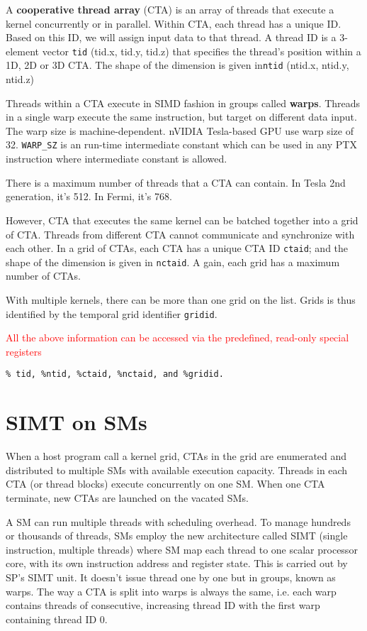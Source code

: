 A {\bf cooperative thread array} (CTA) is an array of threads that
execute a kernel concurrently or in parallel. Within CTA, each thread
has a unique ID. Based on this ID, we will assign input data to that
thread. A thread ID is a 3-element vector \verb!tid! (tid.x, tid.y,
tid.z) that specifies the thread's position within a 1D, 2D or 3D CTA.
The shape of the dimension is given in\verb!ntid! (ntid.x, ntid.y,
ntid.z)

Threads within a CTA execute in SIMD fashion in groups called
{\bf warps}. Threads in a single warp execute the same instruction,
but target on different data input. The warp size is
machine-dependent. nVIDIA Tesla-based GPU use warp size of 32.
\verb!WARP_SZ! is an run-time intermediate constant which can be used
in any PTX instruction where intermediate constant is allowed. 

There is a maximum number of threads that a CTA can contain. In Tesla
2nd generation, it's 512. In Fermi, it's 768. 

However, CTA that executes the same kernel can be batched together
into a grid of CTA. Threads from different CTA cannot communicate and
synchronize with each other. In a grid of CTAs, each CTA has a unique
CTA ID \verb!ctaid!; and the shape of the dimension is given in
\verb!nctaid!. A gain, each grid has a maximum number of CTAs. 

With multiple kernels, there can be more than one grid on the
list. Grids is thus identified by the temporal grid identifier
\verb!gridid!.

\textcolor{red}{All the above information can be accessed via the
  predefined, read-only special registers} 
\begin{lstlisting}
% tid, %ntid, %ctaid, %nctaid, and %gridid.
\end{lstlisting}

\section{SIMT on SMs}
\label{sec:simt-sms}

When a host program call a kernel grid, CTAs in the grid are
enumerated and distributed to multiple SMs with available execution
capacity. Threads in each CTA (or thread blocks) execute concurrently
on one SM. When one CTA terminate, new CTAs are launched on the
vacated SMs. 

A SM can run multiple threads with scheduling overhead. To manage
hundreds or thousands of threads, SMs employ the new architecture
called SIMT (single instruction, multiple threads) where SM map each
thread to one scalar processor core, with its own instruction address
and register state. This is carried out by SP's SIMT unit. It doesn't
issue thread one by one but in groups, known as warps. The way a CTA
is split into warps is always the same, i.e. each warp contains
threads of consecutive, increasing thread ID with the first warp
containing thread ID 0. 




